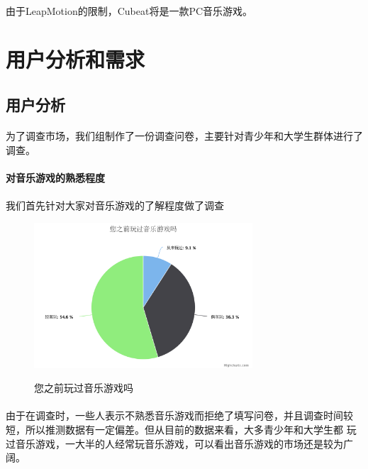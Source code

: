 \documentclass{article} \usepackage{CJK}
\begin{document}
\paragraph{}
由于LeapMotion的限制，Cubeat将是一款PC音乐游戏。
\newpage
\section{用户分析和需求}
\subsection{用户分析}
\paragraph{}
为了调查市场，我们组制作了一份调查问卷，主要针对青少年和大学生群体进行了调查。
\paragraph{对音乐游戏的熟悉程度}
\paragraph{}
我们首先针对大家对音乐游戏的了解程度做了调查
\begin{figure}[H]
  \centering
  \includegraphics[width=22em]{chart1.png}\\
  \caption{您之前玩过音乐游戏吗}\label{2-1}
\end{figure}
\paragraph{}
由于在调查时，一些人表示不熟悉音乐游戏而拒绝了填写问卷，并且调查时间较短，所以推测数据有一定偏差。但从目前的数据来看，大多青少年和大学生都
玩过音乐游戏，一大半的人经常玩音乐游戏，可以看出音乐游戏的市场还是较为广阔。
\end{document}

